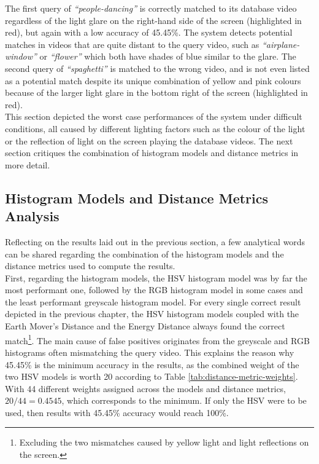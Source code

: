 The first query of \textit{``people-dancing''} is correctly matched to its database video regardless of the light glare on the right-hand side of the screen (highlighted in red), but again with a low accuracy of 45.45\%. The system detects potential matches in videos that are quite distant to the query video, such as \textit{``airplane-window''} or \textit{``flower''} which both have shades of blue similar to the glare. The second query of \textit{``spaghetti''} is matched to the wrong video, and is not even listed as a potential match despite its unique combination of yellow and pink colours because of the larger light glare in the bottom right of the screen (highlighted in red).\\

This section depicted the worst case performances of the system under difficult conditions, all caused by different lighting factors such as the colour of the light or the reflection of light on the screen playing the database videos. The next section critiques the combination of histogram models and distance metrics in more detail.


\subsection{Histogram Models and Distance Metrics Analysis}
\label{sec:evaluation-histogram-models-and-distance-metrics-analysis}

Reflecting on the results laid out in the previous section, a few analytical words can be shared regarding the combination of the histogram models and the distance metrics used to compute the results.\\

First, regarding the histogram models, the HSV histogram model was by far the most performant one, followed by the RGB histogram model in some cases and the least performant greyscale histogram model. For every single correct result depicted in the previous chapter, the HSV histogram models coupled with the Earth Mover's Distance and the Energy Distance always found the correct match\footnote{Excluding the two mismatches caused by yellow light and light reflections on the screen.}. The main cause of false positives originates from the greyscale and RGB histograms often mismatching the query video. This explains the reason why 45.45\% is the minimum accuracy in the results, as the combined weight of the two HSV models is worth 20 according to Table \ref{tab:distance-metric-weights}. With 44 different weights assigned across the models and distance metrics, $20/44=0.4545$, which corresponds to the minimum. If only the HSV were to be used, then results with 45.45\% accuracy would reach 100\%.

